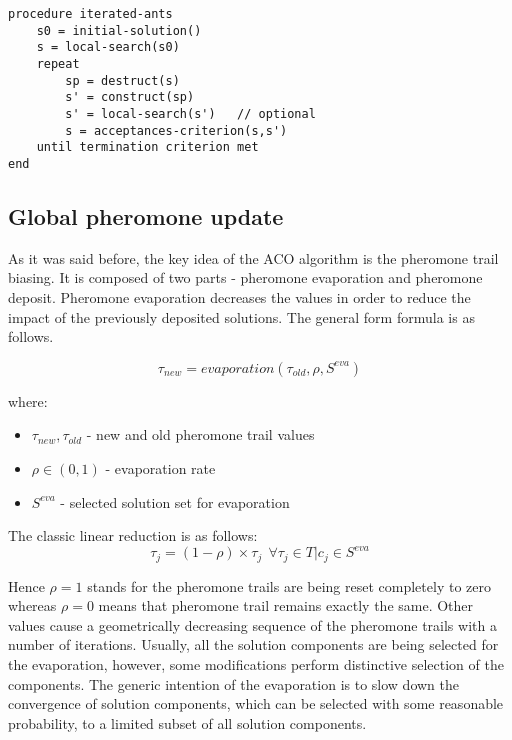 \documentclass[11pt,a4paper,oneside]{book}
\begin{document}
\begin{minipage}[c, breaklines=true]{0.95\textwidth}
\begin{lstlisting}[caption={General iterated ants pseudo-code}, label={lst:iterated-ants}]
procedure iterated-ants
	s0 = initial-solution()
	s = local-search(s0)
	repeat
		sp = destruct(s)
		s' = construct(sp)
		s' = local-search(s')   // optional
		s = acceptances-criterion(s,s')
	until termination criterion met
end
\end{lstlisting}
\end{minipage}



\subsection{Global pheromone update}
As it was said before, the key idea of the ACO algorithm is the pheromone trail biasing. It is composed of two parts - pheromone evaporation and pheromone deposit. Pheromone evaporation decreases the values in order to reduce the impact of the previously deposited solutions. The general form formula is as follows.

\begin{equation}
\tau_{new}=evaporation(\tau_{old}, \rho, S^{eva})
\end{equation}

where:
\begin{itemize}
\item $\tau_{new}, \tau_{old}$ - new and old pheromone trail values
\item $\rho \in (0,1)$ - evaporation rate
\item $S^{eva}$ - selected solution set for evaporation
\end{itemize}

The classic linear reduction is as follows:
\begin{equation}
\tau_j = (1-\rho) \times \tau_j \ \ \forall  \tau_j \in T | c_j \in S^{eva}
\end{equation}

Hence $\rho=1$ stands for the pheromone trails are being reset completely to zero whereas $\rho=0$ means that pheromone trail remains exactly the same. Other values cause a geometrically decreasing sequence of the pheromone trails with a number of iterations. Usually, all the solution components are being selected for the evaporation, however, some modifications perform distinctive selection of the components. The generic intention of the evaporation is to slow down the convergence of solution components, which can be selected with some reasonable probability, to a limited subset of all solution components. \\
\end{document}
